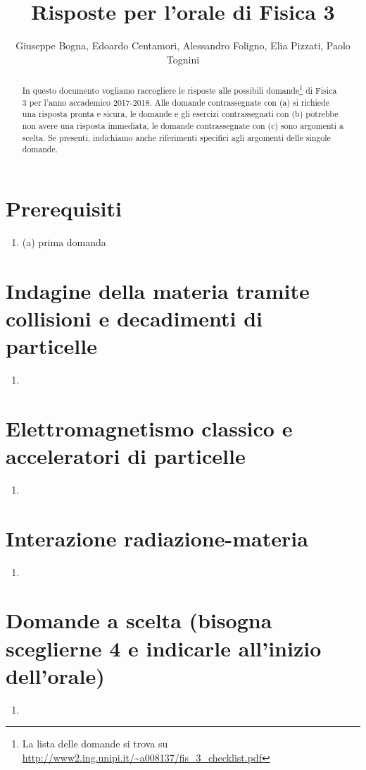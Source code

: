 \documentclass[a4paper,11pt]{article}
\title{Risposte per l'orale di Fisica 3}
\author{Giuseppe Bogna, Edoardo Centamori, Alessandro Foligno, Elia Pizzati, Paolo Tognini}
\renewcommand{\a}{(a) }
\begin{document}
	\maketitle
	\begin{abstract}
		\noindent In questo documento vogliamo raccogliere le risposte alle possibili domande\footnote{La lista delle domande si trova su \url{http://www2.ing.unipi.it/~a008137/fis_3_checklist.pdf}} di Fisica 3 per l'anno accademico 2017-2018. Alle domande contrassegnate con (a) si richiede una risposta pronta e sicura, le domande e gli esercizi contrassegnati con (b) potrebbe non avere una risposta immediata, le domande contrassegnate con (c) sono argomenti a scelta. Se presenti, indichiamo anche riferimenti specifici agli argomenti delle singole domande.
	\end{abstract}
\section{Prerequisiti}
	\begin{enumerate}
		\item \a prima domanda
	\end{enumerate}
\section{Indagine della materia tramite collisioni e decadimenti di particelle}
	\begin{enumerate}
		\item 
	\end{enumerate}
\section{Elettromagnetismo classico e acceleratori di particelle}
	\begin{enumerate}
		\item 
	\end{enumerate}
\section{Interazione radiazione-materia}
	\begin{enumerate}
		\item 
	\end{enumerate}
\section{Domande a scelta (bisogna sceglierne 4 e indicarle all'inizio dell'orale)}
	\begin{enumerate}
		\item 
	\end{enumerate}
\end{document}
